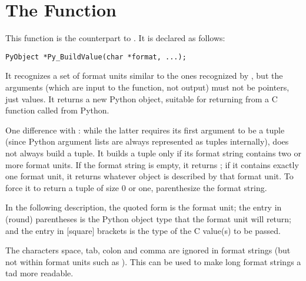 \documentclass{manual}
\begin{document}
\section{The  Function
         \label{buildValue}}

This function is the counterpart to .  It is
declared as follows:

\begin{verbatim}
PyObject *Py_BuildValue(char *format, ...);
\end{verbatim}

It recognizes a set of format units similar to the ones recognized by
, but the arguments (which are input to the
function, not output) must not be pointers, just values.  It returns a
new Python object, suitable for returning from a C function called
from Python.

One difference with : while the latter
requires its first argument to be a tuple (since Python argument lists
are always represented as tuples internally),
 does not always build a tuple.  It builds
a tuple only if its format string contains two or more format units.
If the format string is empty, it returns ; if it contains
exactly one format unit, it returns whatever object is described by
that format unit.  To force it to return a tuple of size 0 or one,
parenthesize the format string.

In the following description, the quoted form is the format unit; the
entry in (round) parentheses is the Python object type that the format
unit will return; and the entry in [square] brackets is the type of
the C value(s) to be passed.

The characters space, tab, colon and comma are ignored in format
strings (but not within format units such as ).  This can be
used to make long format strings a tad more readable.
\end{document}

